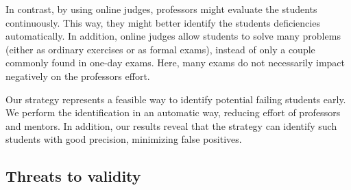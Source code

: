 In contrast, by using online judges, professors might evaluate the students continuously. This way, they might better identify the students deficiencies automatically. In addition, online judges allow students to solve many problems (either as ordinary exercises or as formal exams), instead of only a couple commonly found in one-day exams. Here, many exams do not necessarily impact negatively on the professors effort.

Our strategy represents a feasible way to identify potential failing students early. We perform the identification in an automatic way, reducing effort of professors and mentors. In addition, our results reveal that the strategy can identify such students with good precision, minimizing false positives.









%
%

\subsection{Threats to validity}

